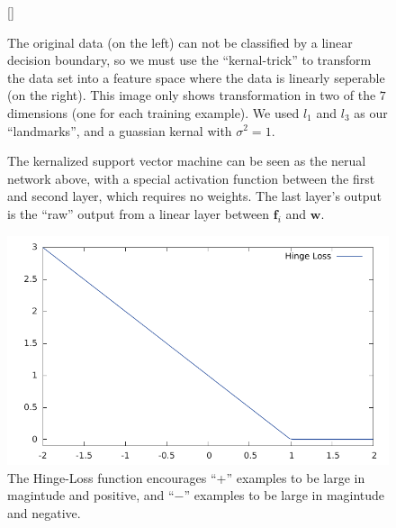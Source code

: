 \message{ !name(main.tex)}\documentclass[11pt]{article}
\begin{document}
\begin{figure}[H]
  \centering
  [\FBwidth]
  {\caption{The original data (on the left) can not be classified by a linear decision boundary, so we must use the ``kernal-trick'' to transform the data set into a feature space where the data is linearly seperable (on the right). This image only shows transformation in two of the $7$ dimensions (one for each training example). We used $l_{1}$ and $l_{3}$ as our ``landmarks'', and a guassian kernal with $\sigma^{2} = 1$.}\label{fig:svm_nonlinear}}{}
\end{figure}

\begin{minipage}{0.47\linewidth}
  \begin{figure}[H]
    \centering
    
    \caption{The kernalized support vector machine can be seen as the nerual network above, with a special activation function between the first and second layer, which requires no weights. The last layer's output is the ``raw'' output from a linear layer between $\mathbf{f}_{i}$ and $\mathbf{w}$.}
    \label{fig:svm_nn}
  \end{figure}
\end{minipage}\hfill
\begin{minipage}{0.47\linewidth}
  \begin{figure}[H]
    \centering
    \includegraphics[width=0.8\linewidth]{HingeLoss}
    \caption{The Hinge-Loss function encourages ``+'' examples to be large in magintude and positive, and ``$-$'' examples to be large in magintude and negative.}
    \label{fig:hinge_loss}
  \end{figure}
\end{minipage}\vspace{0.5cm}
\end{document}

